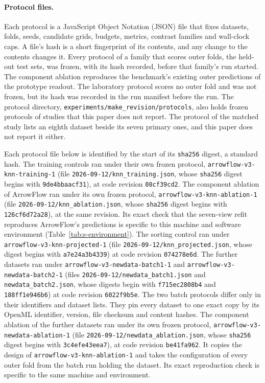 \paragraph{Protocol files.} Each protocol is a JavaScript Object Notation (JSON) file that fixes datasets, folds, seeds, candidate grids, budgets, metrics, contrast families and wall-clock caps. A file's hash is a short fingerprint of its contents, and any change to the contents changes it. Every protocol of a family that scores outer folds, the held-out test sets, was frozen, with its hash recorded, before that family's run started. The component ablation reproduces the benchmark's existing outer predictions of the prototype readout. The laboratory protocol scores no outer fold and was not frozen, but its hash was recorded in the run manifest before the run. The protocol directory, \texttt{experiments/make\_revision/protocols}, also holds frozen protocols of studies that this paper does not report. The protocol of the matched study lists an eighth dataset beside its seven primary ones, and this paper does not report it either.

{\raggedright Each protocol file below is identified by the start of its \texttt{sha256} digest, a standard hash. The training controls ran under their own frozen protocol, \texttt{arrowflow-v3-knn-training-1} (file \texttt{2026-09-12/knn\_training.json}, whose \texttt{sha256} digest begins with \texttt{9de4bbaacf31}), at code revision \texttt{08cf39cd2}.
The component ablation of ArrowFlow ran under its own frozen protocol, \texttt{arrowflow-v3-knn-ablation-1} (file \texttt{2026-09-12/knn\_ablation.json}, whose \texttt{sha256} digest begins with \texttt{126cf6d72a28}), at the same revision. Its exact check that the seven-view refit reproduces ArrowFlow's predictions is specific to this machine and software environment (Table~\ref{tab:s-environment}).
The sorting control ran under \texttt{arrowflow-v3-knn-projected-1} (file \texttt{2026-09-12/knn\_projected.json}, whose digest begins with \texttt{a7e24a3b4339}) at code revision \texttt{074278e6d}. The further datasets ran under \texttt{arrowflow-v3-newdata-batch1-1} and \texttt{arrowflow-v3-newdata-batch2-1} (files \texttt{2026-09-12/newdata\_batch1.json} and \texttt{newdata\_batch2.json}, whose digests begin with \texttt{f715ec2808b4} and \texttt{188ff1e946b6}) at code revision \texttt{6022f9b5e}. The two batch protocols differ only in their identifiers and dataset lists. They pin every dataset to one exact copy by its OpenML identifier, version, file checksum and content hashes.
The component ablation of the further datasets ran under its own frozen protocol, \texttt{arrowflow-v3-newdata-ablation-1} (file \texttt{2026-09-12/newdata\_ablation.json}, whose \texttt{sha256} digest begins with \texttt{3c4efe43eea7}), at code revision \texttt{be41fa962}. It copies the design of \texttt{arrowflow-v3-knn-ablation-1} and takes the configuration of every outer fold from the batch run holding the dataset. Its exact reproduction check is specific to the same machine and environment.\par}

